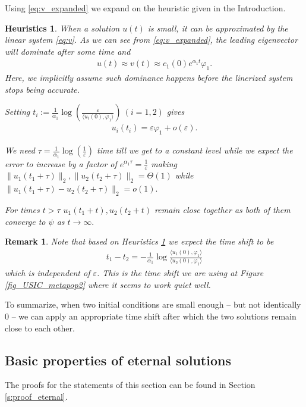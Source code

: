 \documentclass{article}
\newcommand{\1}[1]{{\mathds{1}}_{\left\{#1\right\}}}
\newtheorem{remark}{Remark}
\newtheorem{heuristics}{Heuristics}
\newcommand{\rem}[1]{{#1}}
\begin{document}
\rem{ Using \eqref{eq:v_expanded} we expand on the heuristic given in the Introduction.}
\begin{heuristics}
\label{h:main}
When a solution $u(t)$ is small, it can be approximated by the linear system \eqref{eq:v}. As we can see from \eqref{eq:v_expanded}, the leading eigenvector will dominate after some time and
\begin{align*}
u(t) \approx v(t) \approx c_1(0)e^{\alpha_1 t} \varphi_1.	
\end{align*}
Here, we implicitly assume such dominance happens before the linerized system stops being accurate.

Setting $t_i:=\frac{1}{\alpha_1} \log \left( \frac{\varepsilon}{\langle u_i(0), \varphi_1 \rangle} \right) \ (i=1,2)$ gives
\begin{align*}
u_i(t_i)=\varepsilon \varphi_1+o(\varepsilon).	
\end{align*}

We need $\tau=\frac{1}{\alpha_1}\log \left(\frac{1}{\varepsilon} \right)$ time till we get to a constant level while we expect the error to increase by a factor of $e^{\alpha_1 \tau}=\frac{1}{\varepsilon}$ making $\| u_1(t_1+\tau)\|_2,\|u_2(t_2+\tau) \|_2=\Theta(1)$ while $\|u_1(t_1+\tau)-u_2(t_2+\tau) \|_2=o(1). $

For times $t >\tau$ $u_1(t_1+t),u_2(t_2+t)$ remain close together as both of them converge to $\psi$ as $t\to \infty.$
\end{heuristics}

\rem{
\begin{remark}
Note that based on Heuristics \ref{h:main} we expect the time shift to be
\begin{align}
\label{eq:timeshit}
t_1-t_2=-\frac{1}{\alpha_1} \log \frac{\langle u_1(0),\varphi_1 \rangle}{\langle u_2(0),\varphi_1 \rangle}
\end{align}
which is independent of $\varepsilon$. This is the time shift we are using at Figure \ref{fig_USIC_metapop2} where it seems to work quiet well.
\end{remark}
}
To summarize, when two initial conditions are small enough -- but not identically $0$ -- we can apply an appropriate time shift after which the two solutions remain close to each other.



\subsection{Basic properties of eternal solutions}
The proofs for the statements of this section can be found in Section \ref{s:proof_eternal}.
\end{document}
